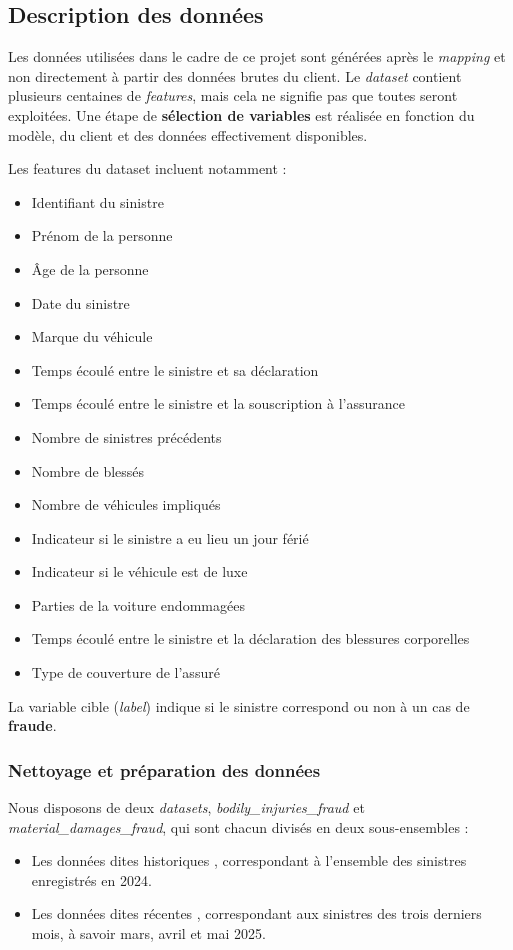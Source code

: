 \documentclass [twoside,openright,a4paper,11pt,french] {report}
\begin{document}
\subsection{Description des données}

Les données utilisées dans le cadre de ce projet sont générées après le \textit{mapping} 
et non directement à partir des données brutes du client. Le \textit{dataset} contient plusieurs 
centaines de \textit{features}, mais cela ne signifie pas que toutes seront exploitées. 
Une étape de \textbf{sélection de variables} est réalisée en fonction du modèle, du client et des données effectivement disponibles.

Les features du dataset incluent notamment :
\begin{itemize}
    \item Identifiant du sinistre
    \item Prénom de la personne
    \item Âge de la personne
    \item Date du sinistre
    \item Marque du véhicule
    \item Temps écoulé entre le sinistre et sa déclaration
    \item Temps écoulé entre le sinistre et la souscription à l'assurance
    \item Nombre de sinistres précédents
    \item Nombre de blessés
    \item Nombre de véhicules impliqués
    \item Indicateur si le sinistre a eu lieu un jour férié
    \item Indicateur si le véhicule est de luxe
    \item Parties de la voiture endommagées
    \item Temps écoulé entre le sinistre et la déclaration des blessures corporelles
    \item Type de couverture de l'assuré
\end{itemize}

La variable cible (\textit{label}) indique si le sinistre correspond ou non à un cas de \textbf{fraude}.

\subsubsection{Nettoyage et préparation des données}

Nous disposons de deux \textit{datasets}, \textit{bodily\_injuries\_fraud} et \textit{material\_damages\_fraud}, qui sont chacun divisés en deux sous-ensembles :
\begin{itemize}
    \item Les données dites \og historiques \fg{}, correspondant à l'ensemble des sinistres enregistrés en 2024.
    \item Les données dites \og récentes \fg{}, correspondant aux sinistres des trois derniers mois, à savoir mars, avril et mai 2025.
\end{itemize}
\end{document}
